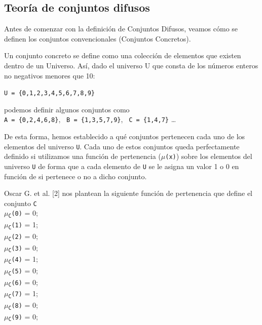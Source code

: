 \subsection{Teoría de conjuntos difusos}
Antes de comenzar con la definición de Conjuntos Difusos, veamos cómo se definen los conjuntos convencionales (Conjuntos Concretos).

Un conjunto concreto se define como una colección de elementos que
existen dentro de un Universo. Así, dado el universo U que consta de los números enteros no negativos menores que 10:

\texttt{U = \{0,1,2,3,4,5,6,7,8,9\}}

podemos definir algunos conjuntos como\\
\newline
\null\hspace{0.59cm}\texttt{A = \{0,2,4,6,8\}},\newline
\null\hspace{0.37cm}\texttt{ B = \{1,3,5,7,9\}},\newline
\null\hspace{0.37cm}\texttt{ C = \{1,4,7\}} \ldots

De esta forma, hemos establecido a qué conjuntos pertenecen cada uno de los elementos del universo \texttt{U}. Cada uno de estos conjuntos queda perfectamente definido si utilizamos una función de pertenencia (\texttt{$\mu$(x)}) sobre los elementos del universo \texttt{U} de forma que a cada elemento de \texttt{U} se le asigna un valor 1 o 0 en función de si pertenece o no a dicho conjunto.

Oscar G. et al. [2] nos plantean la siguiente función de pertenencia que define el conjunto \texttt{C}
\\ \newline
\null\hspace{0.59cm}\texttt{$\mu$\textsubscript{C}(0)} = 0;\\
\null\hspace{0.59cm}\texttt{$\mu$\textsubscript{C}(1)} = 1;\\
\null\hspace{0.59cm}\texttt{$\mu$\textsubscript{C}(2)} = 0;\\
\null\hspace{0.59cm}\texttt{$\mu$\textsubscript{C}(3)} = 0;\\
\null\hspace{0.59cm}\texttt{$\mu$\textsubscript{C}(4)} = 1;\\
\null\hspace{0.59cm}\texttt{$\mu$\textsubscript{C}(5)} = 0;\\
\null\hspace{0.59cm}\texttt{$\mu$\textsubscript{C}(6)} = 0;\\
\null\hspace{0.59cm}\texttt{$\mu$\textsubscript{C}(7)} = 1;\\
\null\hspace{0.59cm}\texttt{$\mu$\textsubscript{C}(8)} = 0;\\
\null\hspace{0.59cm}\texttt{$\mu$\textsubscript{C}(9)} = 0;

